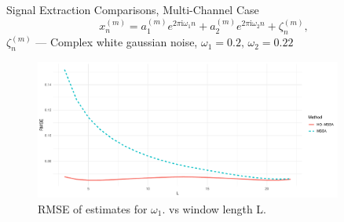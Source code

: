 \documentclass[pdf, unicode, ucs, notheorems]{beamer}
\theoremstyle{definition}
\begin{document}
\begin{frame}{Signal Extraction Comparisons, Multi-Channel Case}
  \[
    x_{n}^{(m)} = a_1^{(m)}
    e^{2 \pi \mathrm{i} \omega_1 n} +
    a_2^{(m)}
    e^{2 \pi \mathrm{i} \omega_2 n} + \zeta_n^{(m)},
  \]
  $\zeta_n^{(m)}$ --- Complex white gaussian noise, $\omega_1 = 0.2,\,
  \omega_2 = 0.22$
  \begin{figure}[!ht]
    \centering
    \includegraphics[width=0.9\textwidth]{img/rec_L_rmse_no_rates.pdf}
    \caption{RMSE of estimates for $\omega_1$. vs window length L.}
  \end{figure}
\end{frame}
\end{document}
